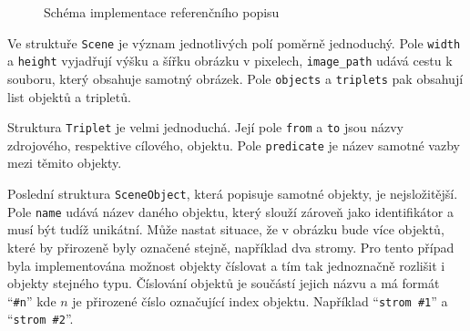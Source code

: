 \begin{figure}[ht!]
	\caption{Schéma implementace referenčního popisu}\label{fig:schema_impl_ref_popis}
\end{figure}

Ve struktuře \texttt{Scene} je význam jednotlivých polí poměrně jednoduchý.
Pole \texttt{width} a \texttt{height} vyjadřují výšku a šířku obrázku v pixelech, \texttt{image\_path} udává cestu k souboru, který obsahuje samotný obrázek.
Pole \texttt{objects} a \texttt{triplets} pak obsahují list objektů a tripletů.

Struktura \texttt{Triplet} je velmi jednoduchá.
Její pole \texttt{from} a \texttt{to} jsou názvy zdrojového, respektive cílového, objektu.
Pole \texttt{predicate} je název samotné vazby mezi těmito objekty.

Poslední struktura \texttt{SceneObject}, která popisuje samotné objekty, je nejsložitější.
Pole \texttt{name} udává název daného objektu, který slouží zároveň jako identifikátor a musí být tudíž unikátní.
Může nastat situace, že v obrázku bude více objektů, které by přirozeně byly označené stejně, například dva stromy.
Pro tento případ byla implementována možnost objekty číslovat a tím tak jednoznačně rozlišit i objekty stejného typu.
Číslování objektů je součástí jejich názvu a má formát \enquote{\texttt{\#n}} kde $n$ je přirozené číslo označující index objektu.
Například \enquote{\texttt{strom \#1}} a \enquote{\texttt{strom \#2}}.


